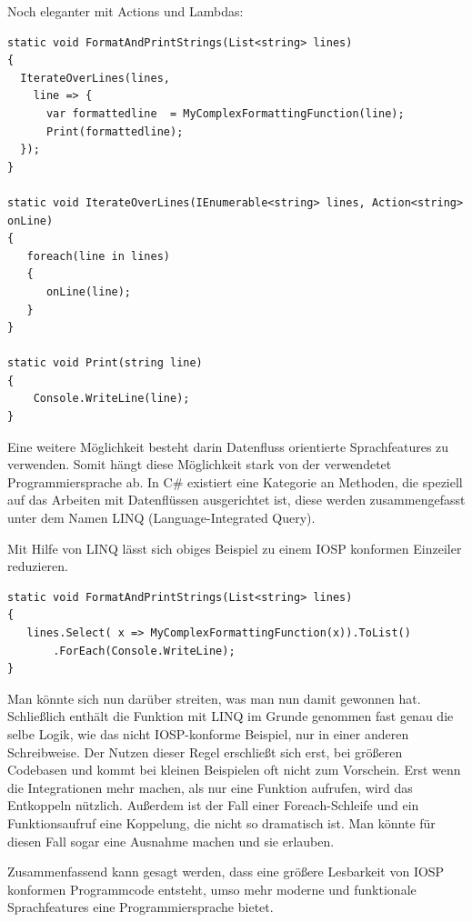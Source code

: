 Noch eleganter mit Actions und Lambdas:

\begin{lstlisting}[caption=FormatAndPrintStrings Variante 3]
static void FormatAndPrintStrings(List<string> lines)
{
  IterateOverLines(lines,
    line => {
      var formattedline  = MyComplexFormattingFunction(line);
      Print(formattedline);
  });
}

static void IterateOverLines(IEnumerable<string> lines, Action<string> onLine)
{
   foreach(line in lines)
   {
      onLine(line);
   }
}

static void Print(string line)
{
    Console.WriteLine(line);
}
\end{lstlisting}


Eine weitere Möglichkeit besteht darin Datenfluss orientierte Sprachfeatures zu verwenden.
Somit hängt diese Möglichkeit stark von der verwendetet Programmiersprache ab.
In C\# existiert eine Kategorie an Methoden, die speziell auf das Arbeiten mit Datenflüssen ausgerichtet ist, diese werden
zusammengefasst unter dem Namen LINQ (Language-Integrated Query).

\bigskip
Mit Hilfe von LINQ lässt sich obiges Beispiel zu einem IOSP konformen Einzeiler reduzieren.

\begin{lstlisting}[caption=FormatAndPrintStrings Variante LINQ]
static void FormatAndPrintStrings(List<string> lines)
{
   lines.Select( x => MyComplexFormattingFunction(x)).ToList()
	   .ForEach(Console.WriteLine);
}
\end{lstlisting}

Man könnte sich nun darüber streiten, was man nun damit gewonnen hat. Schließlich enthält die Funktion mit LINQ im Grunde
genommen fast genau die selbe Logik, wie das nicht IOSP-konforme Beispiel, nur in einer anderen Schreibweise.
Der Nutzen dieser Regel erschließt sich erst, bei größeren Codebasen und kommt bei kleinen Beispielen oft nicht zum Vorschein.
Erst wenn die Integrationen mehr machen, als nur eine Funktion aufrufen, wird das Entkoppeln nützlich.
Außerdem ist der Fall einer Foreach-Schleife und ein Funktionsaufruf eine Koppelung, die nicht so dramatisch ist. Man
könnte für diesen Fall sogar eine Ausnahme machen und sie erlauben.


Zusammenfassend kann gesagt werden, dass eine größere Lesbarkeit von IOSP konformen Programmcode entsteht, umso mehr moderne und funktionale
Sprachfeatures eine Programmiersprache bietet.

